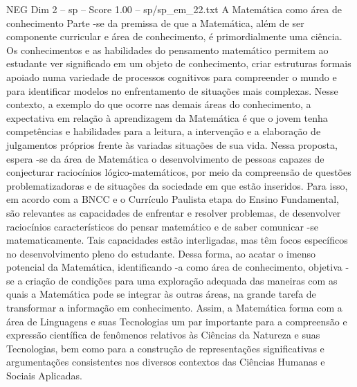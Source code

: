 \begin{textsample}{NEG Dim 2 – sp – Score 1.00 – sp/sp\_em\_22.txt}  \label{ex:f2_neg_090}
A Matemática como área de conhecimento Parte -se da premissa de que a Matemática, além de ser componente curricular e área de conhecimento, é primordialmente uma ciência.
Os conhecimentos e as habilidades do pensamento matemático permitem ao estudante ver significado em um objeto de conhecimento, criar estruturas formais apoiado numa variedade de processos cognitivos para compreender o mundo e para identificar modelos no enfrentamento de situações mais complexas.
Nesse contexto, a exemplo do que ocorre nas demais áreas do conhecimento, a expectativa em relação à aprendizagem da Matemática é que o jovem tenha competências e habilidades para a leitura, a intervenção e a elaboração de julgamentos próprios frente às variadas situações de sua vida.
Nessa proposta, espera -se da área de Matemática o desenvolvimento de pessoas capazes de conjecturar raciocínios lógico-matemáticos, por meio da compreensão de questões problematizadoras e de situações da sociedade em que estão inseridos.
Para isso, em acordo com a BNCC e o Currículo Paulista etapa do Ensino Fundamental, são relevantes as capacidades de enfrentar e resolver problemas, de desenvolver raciocínios característicos do pensar matemático e de saber comunicar -se matematicamente.
Tais capacidades estão interligadas, mas têm focos específicos no desenvolvimento pleno do estudante.
Dessa forma, ao acatar o imenso potencial da Matemática, identificando -a como área de conhecimento, objetiva -se a criação de condições para uma exploração adequada das maneiras com as quais a Matemática pode se integrar às outras áreas, na grande tarefa de transformar a informação em conhecimento.
Assim, a Matemática forma com a área de Linguagens e suas Tecnologias um par importante para a compreensão e expressão científica de fenômenos relativos às Ciências da Natureza e suas Tecnologias, bem como para a construção de representações significativas e argumentações consistentes nos diversos contextos das Ciências Humanas e Sociais Aplicadas.

\end{textsample}
